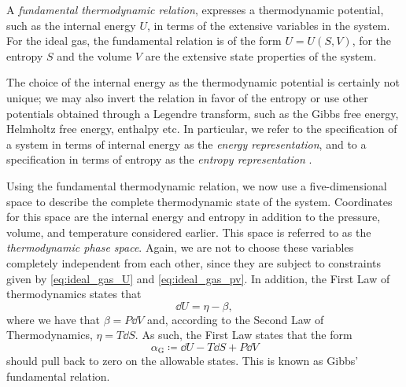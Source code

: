 A \emph{fundamental thermodynamic relation}, expresses a thermodynamic potential, such as the internal energy $U$, in terms of the extensive variables in the system. For the ideal gas, the fundamental relation is of the form $U = U(S, V)$, for the entropy $S$ and the volume $V$ are the extensive state properties of the system. 

The choice of the internal energy as the thermodynamic potential is certainly not unique; we may also invert the relation in favor of the entropy or use other potentials obtained through a Legendre transform, such as the Gibbs free energy, Helmholtz free energy, enthalpy etc. In particular, we refer to the specification of a system in terms of internal energy as the \emph{energy representation}, and to a specification in terms of entropy as the \emph{entropy representation} \cite{VanderSchaft2021a}.

Using the fundamental thermodynamic relation, we now use a five-dimensional space to describe the complete thermodynamic state of the system. Coordinates for this space are the internal energy and entropy in addition to the pressure, volume, and temperature considered earlier. This space is referred to as the \emph{thermodynamic phase space}. Again, we are not to choose these variables completely independent from each other, since they are subject to constraints given by \cref{eq:ideal_gas_U} and \cref{eq:ideal_gas_pv}. In addition, the First Law of thermodynamics states that
$$ \dd{U} = \eta - \beta, $$
where we have that $ \beta = P\dd{V} $ and, according to the Second Law of Thermodynamics, $\eta = T\dd{S}$. As such, the First Law states that the form
\begin{equation} 
    \alpha_\text{G} \coloneq \dd{U} - T\dd{S} + P\dd{V}
    \label{eq:gibbs_relation}
\end{equation}
should pull back to zero on the allowable states. This is known as Gibbs' fundamental relation. 

